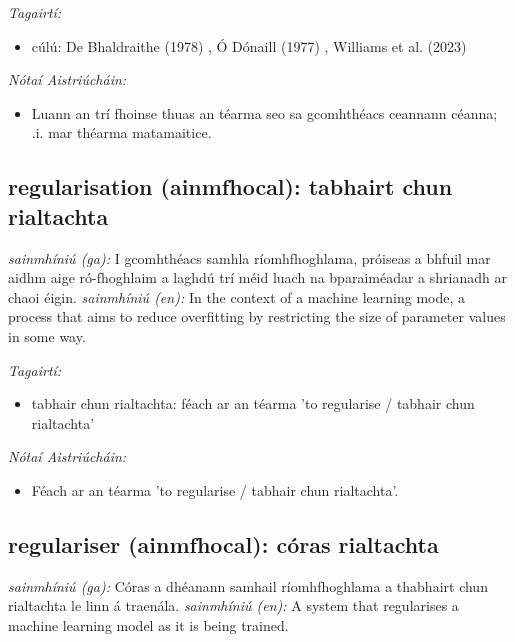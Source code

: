 \documentclass{article}
\begin{document}
 \noindent \textit{Tagairtí:}
\begin{itemize}
	\item cúlú: De Bhaldraithe (1978) \cite{de-bhaldraithe}, Ó Dónaill (1977) \cite{odonaill}, Williams et al. (2023) \cite{storchiste}
\end{itemize}

 \noindent \textit{Nótaí Aistriúcháin:}
\begin{itemize}
	\item Luann an trí fhoinse thuas an téarma seo sa gcomhthéacs ceannann céanna; .i. mar théarma matamaitice.
\end{itemize}


\subsection*{regularisation (ainmfhocal): tabhairt chun rialtachta} 
 \noindent \textit{sainmhíniú (ga):} I gcomhthéacs samhla ríomhfhoghlama, próiseas a bhfuil mar aidhm aige ró-fhoghlaim a laghdú trí méid luach na bparaiméadar a shrianadh ar chaoi éigin.
\newline\newline
 \noindent \textit{sainmhíniú (en):} In the context of a machine learning mode, a process that aims to reduce overfitting by restricting the size of parameter values in some way.
\newline

 \noindent \textit{Tagairtí:}
\begin{itemize}
	\item tabhair chun rialtachta: féach ar an téarma 'to regularise / tabhair chun rialtachta'
\end{itemize}

 \noindent \textit{Nótaí Aistriúcháin:}
\begin{itemize}
	\item Féach ar an téarma 'to regularise / tabhair chun rialtachta'.
\end{itemize}


\subsection*{regulariser (ainmfhocal): córas rialtachta} 
 \noindent \textit{sainmhíniú (ga):} Córas a dhéanann samhail ríomhfhoghlama a thabhairt chun rialtachta le linn á traenála.
\newline\newline
 \noindent \textit{sainmhíniú (en):} A system that regularises a machine learning model as it is being trained.
\newline
\end{document}
